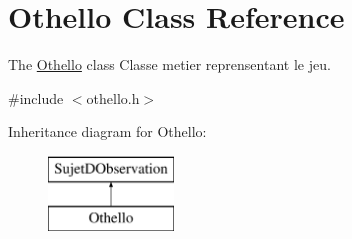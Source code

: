 \hypertarget{class_othello}{}\section{Othello Class Reference}
\label{class_othello}


The \hyperlink{class_othello}{Othello} class Classe metier reprensentant le jeu.  




{\ttfamily \#include $<$othello.\+h$>$}

Inheritance diagram for Othello\+:\begin{figure}[H]
\begin{center}
\leavevmode
\includegraphics[height=2.000000cm]{class_othello}
\end{center}
\end{figure}
